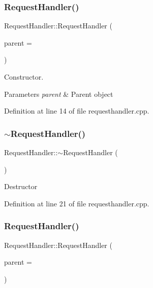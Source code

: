 \subsubsection{\texorpdfstring{Request\+Handler()}{RequestHandler()}\hspace{0.1cm}{\footnotesize\ttfamily [1/2]}}
{\footnotesize\ttfamily Request\+Handler\+::\+Request\+Handler (\begin{DoxyParamCaption}\item[{Q\+Object $\ast$}]{parent = {} }\end{DoxyParamCaption})}

Constructor. 
\begin{DoxyParams}{Parameters}
{\em parent} & Parent object \\
\hline
\end{DoxyParams}


Definition at line 14 of file requesthandler.\+cpp.

\mbox{\label{class_request_handler_a33488d8c2fa1f2c15193c9918960171a}} 
\subsubsection{\texorpdfstring{$\sim$\+Request\+Handler()}{~RequestHandler()}}
{\footnotesize\ttfamily Request\+Handler\+::$\sim$\+Request\+Handler (\begin{DoxyParamCaption}{ }\end{DoxyParamCaption})}

Destructor 

Definition at line 21 of file requesthandler.\+cpp.

\mbox{\label{class_request_handler_a01277e86309630826aa760f6d3eb3788}} 
\subsubsection{\texorpdfstring{Request\+Handler()}{RequestHandler()}\hspace{0.1cm}{\footnotesize\ttfamily [2/2]}}
{\footnotesize\ttfamily Request\+Handler\+::\+Request\+Handler (\begin{DoxyParamCaption}\item[{Q\+Object $\ast$}]{parent = {} }\end{DoxyParamCaption})}

